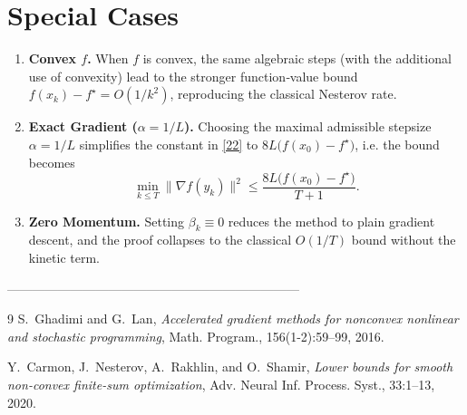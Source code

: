 \documentclass{article}
\newcommand{\grad}{\nabla}
\begin{document}
\section*{Special Cases}
\begin{enumerate}[label=\alph*)]
\item \textbf{Convex $f$.}  When $f$ is convex, the same algebraic steps (with the additional use of convexity) lead to the stronger function‑value bound $f(x_k)-f^\star = O(1/k^2)$, reproducing the classical Nesterov rate.
\item \textbf{Exact Gradient ($\alpha=1/L$).}  Choosing the maximal admissible stepsize $\alpha=1/L$ simplifies the constant in \eqref{22} to $8L\bigl(f(x_0)-f^\star\bigr)$, i.e. the bound becomes
\[
\min_{k\le T}\|\grad f(y_k)\|^2\le \frac{8L\bigl(f(x_0)-f^\star\bigr)}{T+1}.
\]
\item \textbf{Zero Momentum.}  Setting $\beta_k\equiv0$ reduces the method to plain gradient descent, and the proof collapses to the classical $O(1/T)$ bound without the kinetic term.
\end{enumerate}

---------------------------------------------------------------------

\begin{thebibliography}{9}
S.~Ghadimi and G.~Lan, \emph{Accelerated gradient methods for nonconvex
  nonlinear and stochastic programming}, Math. Program., 156(1-2):59--99, 2016.

Y.~Carmon, J.~Nesterov, A.~Rakhlin, and O.~Shamir, \emph{Lower bounds for
  smooth non-convex finite-sum optimization}, Adv. Neural Inf. Process.
  Syst., 33:1--13, 2020.
\end{thebibliography}
\end{document}
